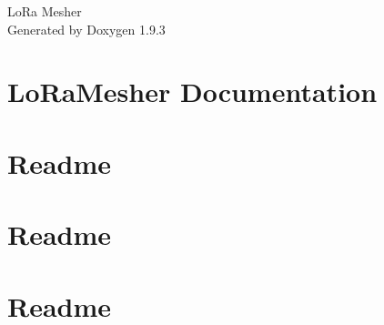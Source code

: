 \documentclass[twoside]{book}
\newcommand{\+}{\discretionary{\mbox{\scriptsize$\hookleftarrow$}}{}{}}
\newcommand{\clearemptydoublepage}{%
    \newpage{\pagestyle{empty}\cleardoublepage}%
  }
\begin{document}
  \raggedbottom
    \hypersetup{pageanchor=false,
                bookmarksnumbered=true,
                pdfencoding=unicode
               }
  \begin{titlepage}
  \vspace*{7cm}
  \begin{center}%
  {\Large Lo\+Ra Mesher}\\
  \vspace*{1cm}
  {\large Generated by Doxygen 1.9.3}\\
  \end{center}
  \end{titlepage}
  \clearemptydoublepage
  \tableofcontents
  \clearemptydoublepage
  \hypersetup{pageanchor=true}
\chapter{Lo\+Ra\+Mesher Documentation}
\label{index}\hypertarget{index}{}
\chapter{Readme}
\label{md__c___users_janm2__documents__platform_i_o__projects__gps_and_display__pio_libdeps_ttgo_t_beam2e386a775cb4a38dfe5b61d11dfcd2cc}

\chapter{Readme}
\label{md__c___users_janm2__documents__platform_i_o__projects__gps_and_display__pio_libdeps_ttgo_t_beam66343a45b20670ea8dae6d177de4e0f5}

\chapter{Readme}
\label{md__c___users_janm2__documents__platform_i_o__projects__gps_and_display__pio_libdeps_ttgo_t_beam75d4ce3fbe0618b3ec88606b3a68aeba}

\end{document}
